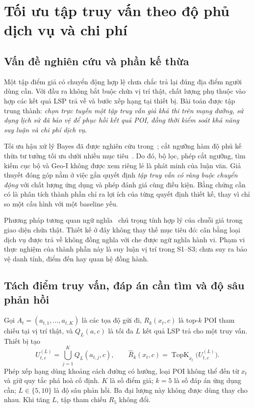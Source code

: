 \section{Tối ưu tập truy vấn theo độ phủ dịch vụ và chi phí}
\label{sec:coverage-frontier-method}

\subsection{Vấn đề nghiên cứu và phần kế thừa}

Một tập điểm giả có chuyển động hợp lệ chưa chắc trả lại đúng địa điểm người dùng cần. Với đầu ra không bắt buộc chứa vị trí thật, chất lượng phụ thuộc vào hợp các kết quả LSP trả về và bước xếp hạng tại thiết bị. Bài toán được tập trung thành: \emph{chọn trực tuyến một tập truy vấn giả khả thi trên mạng đường, sử dụng lịch sử đã bảo vệ để phục hồi kết quả POI, đồng thời kiểm soát khả năng suy luận và chi phí dịch vụ}.

Tối ưu hậu xử lý Bayes đã được nghiên cứu trong~\cite{chatzikokolakis2017utility}; cắt ngưỡng hàm độ phủ kế thừa tư tưởng tối ưu dưới nhiều mục tiêu~\cite{krause2008robust}. Do đó, bộ lọc, phép cắt ngưỡng, tìm kiếm cục bộ và Geo-I không được xem riêng lẻ là phát minh của luận văn. Giả thuyết đóng góp nằm ở việc gắn quyết định \emph{tập truy vấn có ràng buộc chuyển động} với chất lượng ứng dụng và phép đánh giá cùng điều kiện. Bằng chứng cần có là phân tích thành phần chỉ ra lợi ích của từng quyết định thiết kế, thay vì chỉ so một cấu hình với một baseline yếu.

Phương pháp tương quan ngữ nghĩa~\cite{liu2026semantic} chú trọng tính hợp lý của chuỗi giả trong giao diện chứa thật. Thiết kế ở đây không thay thế mục tiêu đó: cân bằng loại dịch vụ được trả về không đồng nghĩa với che được ngữ nghĩa hành vi. Phạm vi thực nghiệm của thành phần này là suy luận vị trí trong S1--S3; chưa suy ra bảo vệ danh tính, điểm đến hay quan hệ đồng hành.

\subsection{Tách điểm truy vấn, đáp án cần tìm và độ sâu phản hồi}

Gọi $A_t=(a_{t,1},\ldots,a_{t,K})$ là các tọa độ gửi đi, $R_k(x_t,c)$ là top-$k$ POI tham chiếu tại vị trí thật, và $Q_L(a,c)$ là tối đa $L$ kết quả LSP trả cho một truy vấn. Thiết bị tạo
\[
 U_{t,c}^{(L)}=\bigcup_{j=1}^{K}Q_L(a_{t,j},c),\qquad
 \widehat R_k(x_t,c)=\operatorname{TopK}_{x_t}
       \bigl(U_{t,c}^{(L)}\bigr).
\]
Phép xếp hạng dùng khoảng cách đường có hướng, loại POI không thể đến từ $x_t$ và giữ quy tắc phá hoà cố định. $K$ là số điểm giả; $k=5$ là số đáp án ứng dụng cần; $L\in\{5,10\}$ là độ sâu phản hồi. Ba đại lượng này không được dùng thay cho nhau. Khi tăng $L$, tập tham chiếu $R_5$ không đổi.

